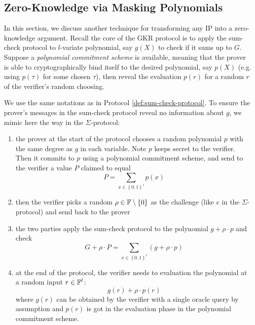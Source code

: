 \documentclass{article}
\begin{document}
\subsection{Zero-Knowledge via Masking Polynomials}

In this section, we discuss another technique for transforming any IP into a zero-knowledge argument. Recall the core of the GKR protocol is to apply the sum-check protocol to $l$-variate polynomial, say $g(X)$ to check if it sums up to $G$. Suppose a \textit{polynomial commitment scheme} is available, meaning that the prover is able to cryptographically bind itself to the desired polynomial, say $p(X)$ (e.g. using $p(\tau)$ for some chosen $\tau$), then reveal the evaluation $p(r)$ for a random $r$ of the verifier's random choosing. 

We use the same notations as in Protocol \ref{def:sum-check-protocol}. To ensure the prover's messages in the sum-check protocol reveal no information about $g$, we mimic here the way in the $\Sigma$-protocol:

\begin{enumerate}
\item\label{item:70} the prover at the start of the protocol chooses a random polynomial $p$ with the same degree as $g$ in each variable. Note $p$ keeps secret to the verifier. Then it commits to $p$ using a polynomial commitment scheme, and send to the verifier a value $P$ claimed to equal
\begin{equation*}
P = \sum_{x \in \left\{ 0, 1 \right\}^l} p(x)
\end{equation*} 
\item\label{item:71} then the verifier picks a random $\rho \in \mathbb{F} \setminus \left\{ 0 \right\}$ as the challenge (like $e$ in the $\Sigma$-protocol) and send back to the prover 
\item\label{item:72} the two parties apply the sum-check protocol to the polynomial $g + \rho \cdot p$ and check 
\begin{equation} \label{eq:G+rho P}
G + \rho \cdot P = \sum_{x \in \left\{ 0, 1 \right\}^l} (g + \rho \cdot p)
\end{equation}
\item\label{item:73} at the end of the protocol, the verifier needs to evaluation the polynomial at a random input $r \in \mathbb{F}^l$:
\begin{equation*}
g(r) + \rho \cdot p(r)
\end{equation*}
where $g(r)$ can be obtained by the verifier with a single oracle query by assumption and $p(r)$ is got in the evaluation phase in the polynomial commitment scheme. 
\end{enumerate}
\end{document}
